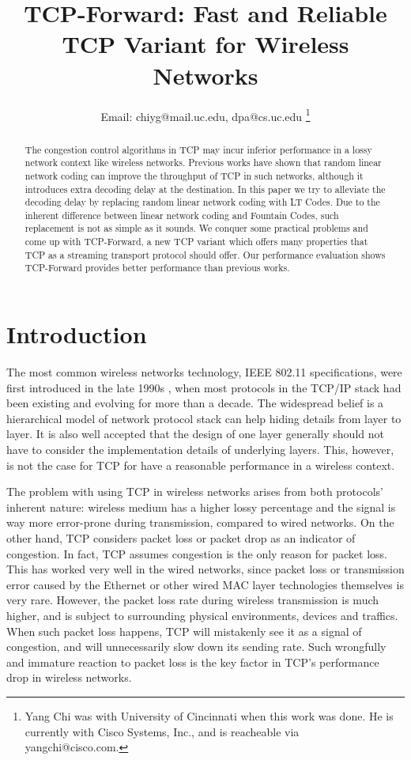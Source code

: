 \documentclass[10pt, conference, final, letterpaper]{IEEEtran}
\author{
\IEEEauthorblockN{Yang CHI{} and Dharma P. Agrawal}
\IEEEauthorblockA{Center of Distributed and Mobile Computing, School of Computing Sciences and Informatics\\
University of Cincinnati, Cincinnati, OH 45221 - 0008}
Email: chiyg@mail.uc.edu, dpa@cs.uc.edu
\thanks{Yang Chi was with University of Cincinnati when this work was done. He is currently with Cisco Systems, Inc., and is reacheable via yangchi@cisco.com.}
}
\title{TCP-Forward: Fast and Reliable TCP Variant for Wireless Networks}
\theoremstyle{definition}
\begin{document}
\maketitle

\begin{abstract}
The congestion control algorithms in TCP may incur inferior performance in a lossy network context like wireless networks. Previous works have shown that random linear network coding can improve the throughput of TCP in such networks, although it introduces extra decoding delay at the destination. In this paper we try to alleviate the decoding delay by replacing random linear network coding with LT Codes. Due to the inherent difference between linear network coding and Fountain Codes, such replacement is not as simple as it sounds. We conquer some practical problems and come up with TCP-Forward, a new TCP variant which offers many properties that TCP as a streaming transport protocol should offer. Our performance evaluation shows TCP-Forward provides better performance than previous works.
\end{abstract}

\section{Introduction}
\label{sec:intro}

The most common wireless networks technology, IEEE 802.11 specifications, were first introduced in the late 1990s \cite{IEEE80211Legacy} \cite{IEEE80211Legacy99}, when most protocols in the TCP/IP stack had been existing and evolving for more than a decade. The widespread belief is a hierarchical model of network protocol stack can help hiding details from layer to layer. It is also well accepted that the design of one layer generally should not have to consider the implementation details of underlying layers. This, however, is not the case for TCP for have a reasonable performance in a wireless context.

The problem with using TCP in wireless networks arises from both protocols' inherent nature: wireless medium has a higher lossy percentage and the signal is way more error-prone during transmission, compared to wired networks. On the other hand, TCP considers packet loss or packet drop as an indicator of congestion. In fact, TCP assumes congestion is the only reason for packet loss. This has worked very well in the wired networks, since packet loss or transmission error caused by the Ethernet or other wired MAC layer technologies themselves is very rare. However, the packet loss rate during wireless transmission is much higher, and is subject to surrounding physical environments, devices and traffics. When such packet loss happens, TCP will mistakenly see it as a signal of congestion, and will unnecessarily slow down its sending rate. Such wrongfully and immature reaction to packet loss is the key factor in TCP's performance drop in wireless networks.
\end{document}
